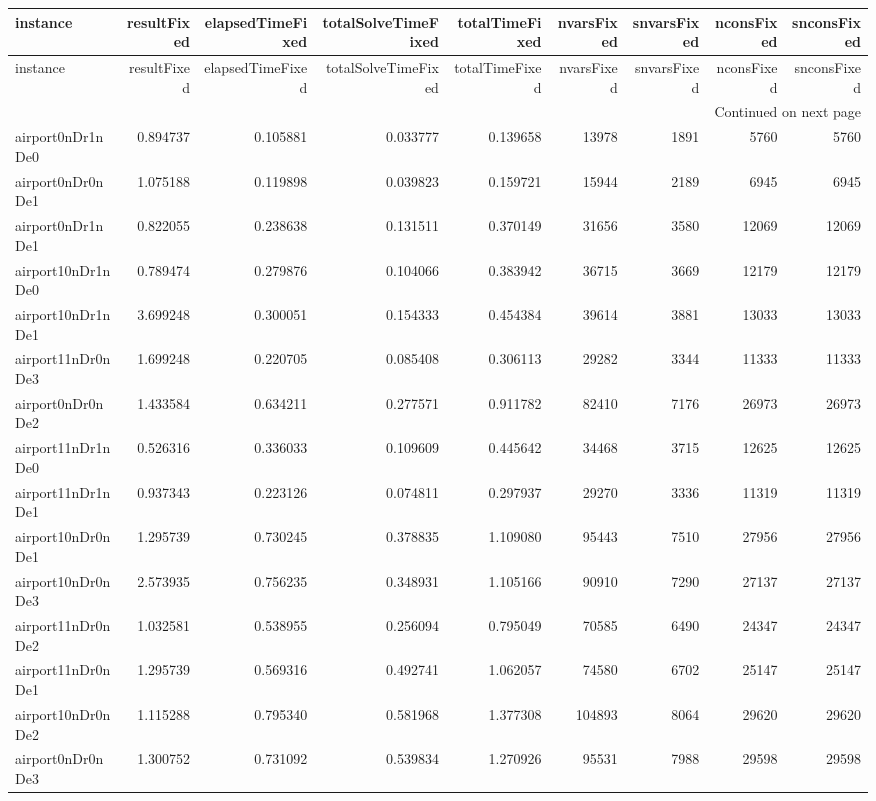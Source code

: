 
\begin{longtable}{|l|r|r|r|r|r|r|r|r|}
\toprule
instance & resultFixed & elapsedTimeFixed & totalSolveTimeFixed & totalTimeFixed & nvarsFixed & snvarsFixed & nconsFixed & snconsFixed \\
\midrule
\endfirsthead
\toprule
instance & resultFixed & elapsedTimeFixed & totalSolveTimeFixed & totalTimeFixed & nvarsFixed & snvarsFixed & nconsFixed & snconsFixed \\
\midrule
\endhead
\midrule
\multicolumn{9}{r}{Continued on next page} \\
\midrule
\endfoot
\bottomrule
\endlastfoot
airport0nDr1nDe0 & 0.894737 & 0.105881 & 0.033777 & 0.139658 & 13978 & 1891 & 5760 & 5760 \\
airport0nDr0nDe1 & 1.075188 & 0.119898 & 0.039823 & 0.159721 & 15944 & 2189 & 6945 & 6945 \\
airport0nDr1nDe1 & 0.822055 & 0.238638 & 0.131511 & 0.370149 & 31656 & 3580 & 12069 & 12069 \\
airport10nDr1nDe0 & 0.789474 & 0.279876 & 0.104066 & 0.383942 & 36715 & 3669 & 12179 & 12179 \\
airport10nDr1nDe1 & 3.699248 & 0.300051 & 0.154333 & 0.454384 & 39614 & 3881 & 13033 & 13033 \\
airport11nDr0nDe3 & 1.699248 & 0.220705 & 0.085408 & 0.306113 & 29282 & 3344 & 11333 & 11333 \\
airport0nDr0nDe2 & 1.433584 & 0.634211 & 0.277571 & 0.911782 & 82410 & 7176 & 26973 & 26973 \\
airport11nDr1nDe0 & 0.526316 & 0.336033 & 0.109609 & 0.445642 & 34468 & 3715 & 12625 & 12625 \\
airport11nDr1nDe1 & 0.937343 & 0.223126 & 0.074811 & 0.297937 & 29270 & 3336 & 11319 & 11319 \\
airport10nDr0nDe1 & 1.295739 & 0.730245 & 0.378835 & 1.109080 & 95443 & 7510 & 27956 & 27956 \\
airport10nDr0nDe3 & 2.573935 & 0.756235 & 0.348931 & 1.105166 & 90910 & 7290 & 27137 & 27137 \\
airport11nDr0nDe2 & 1.032581 & 0.538955 & 0.256094 & 0.795049 & 70585 & 6490 & 24347 & 24347 \\
airport11nDr0nDe1 & 1.295739 & 0.569316 & 0.492741 & 1.062057 & 74580 & 6702 & 25147 & 25147 \\
airport10nDr0nDe2 & 1.115288 & 0.795340 & 0.581968 & 1.377308 & 104893 & 8064 & 29620 & 29620 \\
airport0nDr0nDe3 & 1.300752 & 0.731092 & 0.539834 & 1.270926 & 95531 & 7988 & 29598 & 29598 \\

\end{longtable}
